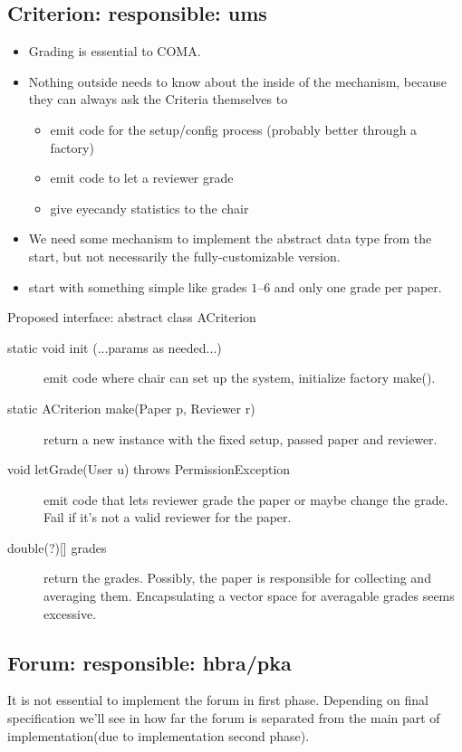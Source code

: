 \documentclass[a4paper]{article}
\begin{document}
  \subsection{Criterion: responsible: ums}\label{sec:1:criterion}
  \begin{itemize}
  \item Grading is essential to COMA.
  \item Nothing outside needs to know about the inside of the
    mechanism, because they can always ask the Criteria themselves to
    \begin{itemize}
    \item emit code for the setup/config process (probably better through
      a factory)
    \item emit code to let a reviewer grade
    \item give eyecandy statistics to the chair
    \end{itemize}
  \item We need some mechanism to implement the abstract data type
    from the start, but not necessarily the fully-customizable
    version.
  \item start with something simple like grades $1$--$6$ and only one
    grade per paper.
  
  \end{itemize}
%
  Proposed interface:
  abstract class ACriterion 
  \begin{description}
  \item [static void init (...params as needed...)] emit code where
    chair can set up the system, initialize factory make().
  \item [static ACriterion make(Paper p, Reviewer r)] return a new
    instance with the fixed setup, passed paper and reviewer.
  \item [void letGrade(User u) throws PermissionException] emit code
    that lets reviewer grade the paper or maybe change the grade. Fail
    if it's not a valid reviewer for the paper.
  \item [{double(?)[] grades}] return the grades. Possibly, the paper
    is responsible for collecting and averaging them. Encapsulating a
    vector space for averagable grades seems excessive.
  \end{description}
   \subsection{Forum: responsible: hbra/pka }\label{sec:1:forum}
 It is not essential to implement the forum in first phase. Depending on final specification we'll see in how far the forum is separated from the main part of implementation(due to implementation second phase).
\end{document}
